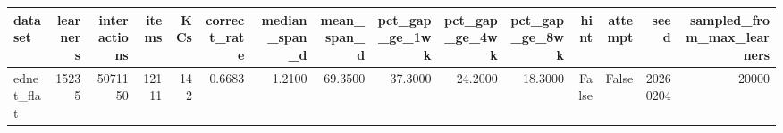 \begin{tabular}{lrrrrrrrrrrrrrr}
\toprule
dataset & learners & interactions & items & KCs & correct\_rate & median\_span\_d & mean\_span\_d & pct\_gap\_ge\_1wk & pct\_gap\_ge\_4wk & pct\_gap\_ge\_8wk & hint & attempt & seed & sampled\_from\_max\_learners \\
\midrule
ednet\_flat & 15235 & 5071150 & 12111 & 142 & 0.6683 & 1.2100 & 69.3500 & 37.3000 & 24.2000 & 18.3000 & False & False & 20260204 & 20000 \\
\bottomrule
\end{tabular}
